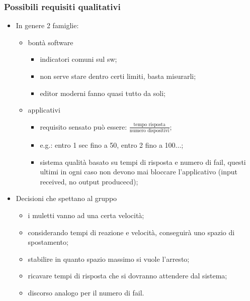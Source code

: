     \subsubsection{Possibili requisiti qualitativi}
        \begin{itemize}
            \item In genere 2 famiglie:
                \begin{itemize}
                    \item bontà software
                        \begin{itemize}
                            \item indicatori comuni sul sw;
                            \item non serve stare dentro certi limiti, basta misurarli;
                            \item editor moderni fanno quasi tutto da soli;
                        \end{itemize}
                    \item applicativi
                        \begin{itemize}
                            \item requisito sensato può essere: $\frac{\text{tempo risposta}}{\text{numero dispositivi}}$;
                            \item e.g.: entro 1 sec fino a 50, entro 2 fino a 100...;
                            \item sistema qualità basato su tempi di risposta e numero di fail, questi ultimi in ogni caso non devono mai bloccare l'applicativo (input received, no output producecd);
                        \end{itemize}
                \end{itemize}
            \item Decisioni che spettano al gruppo
                \begin{itemize}
                    \item i muletti vanno ad una certa velocità;
                    \item considerando tempi di reazione e velocità, conseguirà uno spazio di spostamento;
                    \item stabilire in quanto spazio massimo si vuole l'arresto;
                    \item ricavare tempi di risposta che si dovranno attendere dal sistema;
                    \item discorso analogo per il numero di fail.
                \end{itemize}
        \end{itemize}

